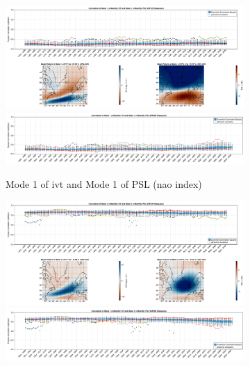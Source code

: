 \begin{figure}[!htbp]
  \centering
  \begin{subfigure}[b]{0.95\textwidth}
        \includegraphics[width=\textwidth]{figures/correlation_boxplot_ivt_psl_modes11_ssp126_50seasons.png}
        \includegraphics[width=\textwidth]{figures/correlation_boxplot_ivt_psl_modes11_ssp585_50seasons.png}
    \caption{Mode 1 of \ac{ivt} and Mode 1 of PSL (\ac{nao} index)}
    \label{fig:cor ivt psl modes11}
  \end{subfigure}
  \hfill
  \begin{subfigure}[b]{0.95\textwidth}
        \includegraphics[width=\textwidth]{figures/correlation_boxplot_ivt_psl_modes22_ssp126_50seasons.png}
        \includegraphics[width=\textwidth]{figures/correlation_boxplot_ivt_psl_modes22_ssp585_50seasons.png}

\end{subfigure}
\end{figure}
